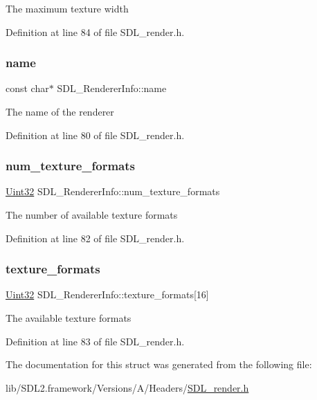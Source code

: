 The maximum texture width 

Definition at line 84 of file S\+D\+L\+\_\+render.\+h.

\mbox{\label{struct_s_d_l___renderer_info_a433ecb2865c81ba9f28038e56a4ae6f3}} 
\subsubsection{\texorpdfstring{name}{name}}
{\footnotesize\ttfamily const char$\ast$ S\+D\+L\+\_\+\+Renderer\+Info\+::name}

The name of the renderer 

Definition at line 80 of file S\+D\+L\+\_\+render.\+h.

\mbox{\label{struct_s_d_l___renderer_info_acdec165b2053b914313f5996983ec6b8}} 
\subsubsection{\texorpdfstring{num\_texture\_formats}{num\_texture\_formats}}
{\footnotesize\ttfamily \mbox{\hyperlink{_s_d_l__stdinc_8h_add440eff171ea5f55cb00c4a9ab8672d}{Uint32}} S\+D\+L\+\_\+\+Renderer\+Info\+::num\+\_\+texture\+\_\+formats}

The number of available texture formats 

Definition at line 82 of file S\+D\+L\+\_\+render.\+h.

\mbox{\label{struct_s_d_l___renderer_info_a88450f9d48e593ec4571e3ba7cc3427d}} 
\subsubsection{\texorpdfstring{texture\_formats}{texture\_formats}}
{\footnotesize\ttfamily \mbox{\hyperlink{_s_d_l__stdinc_8h_add440eff171ea5f55cb00c4a9ab8672d}{Uint32}} S\+D\+L\+\_\+\+Renderer\+Info\+::texture\+\_\+formats\mbox{[}16\mbox{]}}

The available texture formats 

Definition at line 83 of file S\+D\+L\+\_\+render.\+h.



The documentation for this struct was generated from the following file\+:\begin{DoxyCompactItemize}
\item 
lib/\+S\+D\+L2.\+framework/\+Versions/\+A/\+Headers/\mbox{\hyperlink{_s_d_l__render_8h}{S\+D\+L\+\_\+render.\+h}}\end{DoxyCompactItemize}
